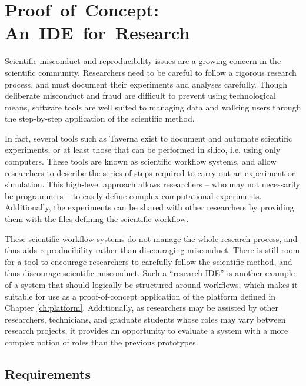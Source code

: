 \documentclass[document.tex]{subfiles}
\begin{document}
\chapter{Proof~of~Concept: An~IDE~for~Research}
\label {ch:case-study-2}

Scientific misconduct and reproducibility issues are a growing concern in the scientific community. Researchers need to be careful to follow a rigorous research process, and must document their experiments and analyses carefully. Though deliberate misconduct and fraud are difficult to prevent using technological means, software tools are well suited to managing data and walking users through the step-by-step application of the scientific method.

In fact, several tools such as Taverna \cite{taverna-website} exist to document and automate scientific experiments, or at least those that can be performed in silico, i.e. using only computers. These tools are known as scientific workflow systems, and allow researchers to describe the series of steps required to carry out an experiment or simulation. This high-level approach allows researchers -- who may not necessarily be programmers -- to easily define complex computational experiments. Additionally, the experiments can be shared with other researchers by providing them with the files defining the scientific workflow.

These scientific workflow systems do not manage the whole research process, and thus aids reproducibility rather than discouraging misconduct. There is still room for a tool to encourage researchers to carefully follow the scientific method, and thus discourage scientific misconduct. Such a ``research IDE'' is another example of a system that should logically be structured around workflows, which makes it suitable for use as a proof-of-concept application of the platform defined in Chapter \ref{ch:platform}. Additionally, as researchers may be assisted by other researchers, technicians, and graduate students whose roles may vary between research projects, it provides an opportunity to evaluate a system with a more complex notion of roles than the previous prototypes.

\section {Requirements}
\label{sec:case-research-requirements}
\end{document}
